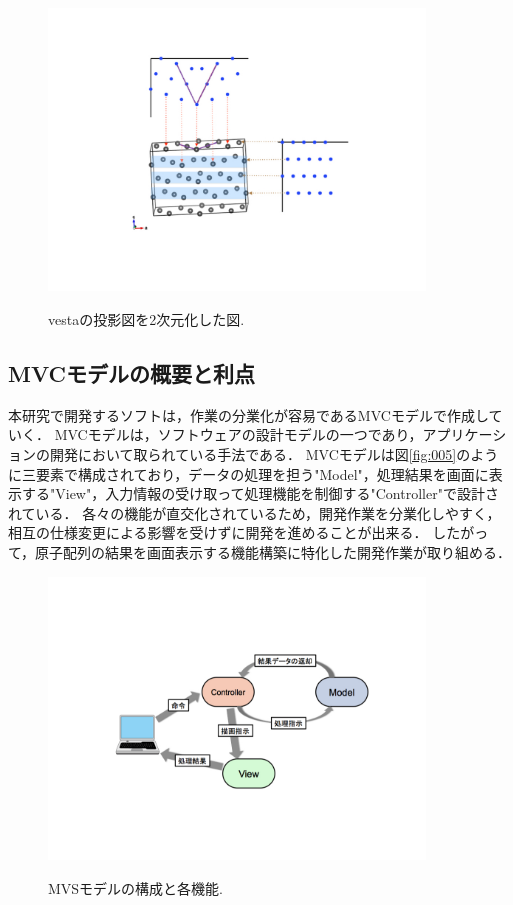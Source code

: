 \begin{figure}[htbp]\begin{center}
\includegraphics[width=10cm,bb= 0 0 937 753]{../figs/./boundary_narita.007.jpeg}
\caption{vestaの投影図を2次元化した図.}
\label{fig:007}
\label{default}\end{center}\end{figure}
\subsection{MVCモデルの概要と利点}
本研究で開発するソフトは，作業の分業化が容易であるMVCモデルで作成していく．
MVCモデルは，ソフトウェアの設計モデルの一つであり，アプリケーションの開発において取られている手法である．
MVCモデルは図\ref{fig:005}のように三要素で構成されており，データの処理を担う"Model"，処理結果を画面に表示する"View"，入力情報の受け取って処理機能を制御する"Controller"で設計されている．
各々の機能が直交化されているため，開発作業を分業化しやすく，相互の仕様変更による影響を受けずに開発を進めることが出来る\cite{MVC}．
したがって，原子配列の結果を画面表示する機能構築に特化した開発作業が取り組める．

\begin{figure}[htbp]\begin{center}
\includegraphics[width=10cm,bb= 0 0 937 753]{../figs/./boundary_narita.005.jpeg}
\caption{MVSモデルの構成と各機能.}
\label{fig:005}
\label{default}\end{center}\end{figure}
